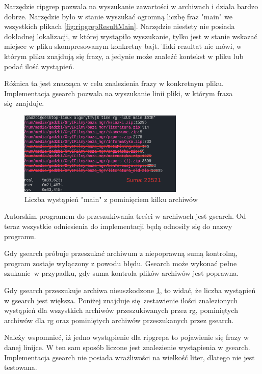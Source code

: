 Narzędzie ripgrep pozwala na wyszukanie zawartości w archiwach i działa bardzo dobrze.
Narzędzie było w stanie wyszukać ogromną liczbę fraz "main" we wszystkich plikach \ref{fig:ripgrepResultMain}.
Narzędzie niestety nie posiada dokładnej lokalizacji, w której wystąpiło wyszukanie,
tylko jest w stanie wskazać miejsce w pliku skompresowanym konkretny bajt.
Taki rezultat nie mówi, w którym pliku znajdują się frazy, a jedynie może znaleźć 
kontekst w pliku lub podać ilość wystąpień.

Różnica ta jest znacząca w celu znalezienia frazy w konkretnym pliku. 
Implementacja gsearch pozwala na wyszukanie linii pliki, w którym fraza się znajduje. 

\begin{figure}[h]
\centering
\includegraphics[width=0.7\textwidth]{./images/rgSkippedmain.png}
\caption{Liczba wystąpień "main" z pominięciem kilku archiwów}
\label{fig:ripgrepRemoveSkipped}
\end{figure}

Autorskim programem do przeszukiwania treści w archiwach jest gsearch. Od teraz
wszystkie odniesienia do implementacji będą odnosiły się do nazwy programu.

Gdy gsearch próbuje przeszukać archiwum z niepoprawną sumą kontrolną, program
zostaje wyłączony z powodu błędu. Gsearch może wykonać pełne szukanie w przypadku,
gdy suma kontrola plików archiwów jest poprawna.

Gdy gsearch przeszukuje archiwa nieuszkodzone \ref{fig:ripgrepRemoveSkipped},
to widać, że liczba wystąpień w gsearch jest większa. Poniżej znajduje się zestawienie
ilości znalezionych wystąpień dla wszystkich archiwów przeszukiwanych przez rg,
pominiętych archiwów dla rg oraz pominiętych archiwów przeszukanych przez gsearch.

Należy wspomnieć, iż jedno wystąpienie dla ripgrepa to pojawienie się frazy
w danej linijce. W ten sam sposób liczone jest znalezienie wystąpienia w gsearch.
Implementacja gsearch nie posiada wrażliwości na wielkość liter, dlatego nie 
jest testowana.

